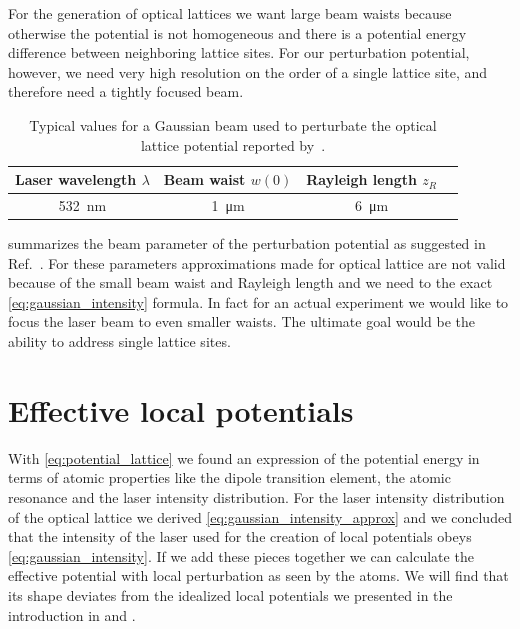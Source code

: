 For the generation of optical lattices we want large beam waists because
otherwise the potential is not homogeneous and there is a potential energy
difference between neighboring lattice sites. For our perturbation potential,
however, we need very high resolution on the order of a single lattice site,
and therefore need a tightly focused beam.
\begin{table}[htb]
  \centering
  \begin{tabular}{cccc}
    \toprule
    Laser wavelength $\lambda$ &
    Beam waist $w(0)$ &
    Rayleigh length $z_R$ \\
    \midrule
    \SI{532}{\nano\meter} &
    \SI{1}{\micro\meter} &
    \SI{6}{\micro\meter} \\
    \bottomrule
  \end{tabular}
  \captionsetup{width=.8\textwidth}
  \caption{Typical values for a Gaussian beam used to perturbate the optical
    lattice potential reported by~\cite{Hertlein2017}.
  }\label{tab:gaussian_beam_perturbation}
\end{table}
 summarizes the beam parameter of the
perturbation potential as suggested in Ref.~\cite{Hertlein2017}. For these
parameters approximations made for optical lattice are not valid because of
the small beam waist and Rayleigh length and we need to the exact
\cref{eq:gaussian_intensity} formula. In fact for an actual experiment we
would like to focus the laser beam to even smaller waists. The ultimate goal
would be the ability to address single lattice sites.

\section{Effective local potentials}

With \cref{eq:potential_lattice} we found an expression of the potential
energy in terms of atomic properties like the dipole transition element, the
atomic resonance and the laser intensity distribution. For the laser intensity
distribution of the optical lattice we derived
\cref{eq:gaussian_intensity_approx} and we concluded that the intensity of the
laser used for the creation of local potentials obeys
\cref{eq:gaussian_intensity}. If we add these pieces together we can calculate
the effective potential with local perturbation as seen by the atoms. We will
find that its shape deviates from the idealized local potentials we presented
in the introduction in  and 
.

